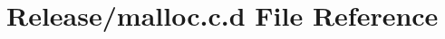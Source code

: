 \hypertarget{_release_2malloc_8c_8d}{\section{\-Release/malloc.c.\-d \-File \-Reference}
\label{_release_2malloc_8c_8d}
}
